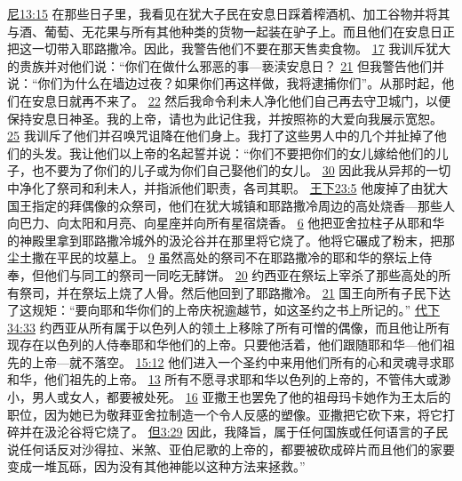 \documentclass[12pt, a4paper, oneside]{ctexart}
\begin{document}
{		\href{https://biblehub.com/nehemiah/13-15.htm}{尼13:15} 在那些日子里，我看见在犹大子民在安息日踩着榨酒机、加工谷物并将其与酒、葡萄、无花果与所有其他种类的货物一起装在驴子上。而且他们在安息日正把这一切带入耶路撒冷。因此，我警告他们不要在那天售卖食物。
		\href{https://biblehub.com/nehemiah/13-17.htm}{17} 我训斥犹大的贵族并对他们说：“你们在做什么邪恶的事---亵渎安息日？
		\href{https://biblehub.com/nehemiah/13-21.htm}{21} 但我警告他们并说：“你们为什么在墙边过夜？如果你们再这样做，我将逮捕你们”。从那时起，他们在安息日就再不来了。
		\href{https://biblehub.com/nehemiah/13-22.htm}{22} 然后我命令利未人净化他们自己再去守卫城门，以便保持安息日神圣。我的上帝，请也为此记住我，并按照祢的大爱向我展示宽恕。
		\href{https://biblehub.com/nehemiah/13-25.htm}{25} 我训斥了他们并召唤咒诅降在他们身上。我打了这些男人中的几个并扯掉了他们的头发。我让他们以上帝的名起誓并说：“你们不要把你们的女儿嫁给他们的儿子，也不要为了你们的儿子或为你们自己娶他们的女儿。
		\href{https://biblehub.com/nehemiah/13-30.htm}{30} 因此我从异邦的一切中净化了祭司和利未人，并指派他们职责，各司其职。
		\href{https://biblehub.com/2_kings/23-5.htm}{王下23:5} 他废掉了由犹大国王指定的拜偶像的众祭司，他们在犹大城镇和耶路撒冷周边的高处烧香---那些人向巴力、向太阳和月亮、向星座并向所有星宿烧香。
		\href{https://biblehub.com/2_kings/23-6.htm}{6} 他把亚舍拉柱子从耶和华的神殿里拿到耶路撒冷城外的汲沦谷并在那里将它烧了。他将它碾成了粉末，把那尘土撒在平民的坟墓上。
		\href{https://biblehub.com/2_kings/23-9.htm}{9} 虽然高处的祭司不在耶路撒冷的耶和华的祭坛上侍奉，但他们与同工的祭司一同吃无酵饼。
		\href{https://biblehub.com/2_kings/23-20.htm}{20} 约西亚在祭坛上宰杀了那些高处的所有祭司，并在祭坛上烧了人骨。然后他回到了耶路撒冷。
		\href{https://biblehub.com/2_kings/23-21.htm}{21} 国王向所有子民下达了这规矩：“要向耶和华你们的上帝庆祝逾越节，如这圣约之书上所记的。”
		\href{https://biblehub.com/2_chronicles/34-33.htm}{代下34:33} 约西亚从所有属于以色列人的领土上移除了所有可憎的偶像，而且他让所有现存在以色列的人侍奉耶和华他们的上帝。只要他活着，他们跟随耶和华---他们祖先的上帝---就不落空。
		\href{https://biblehub.com/2_chronicles/15-12.htm}{15:12} 他们进入一个圣约中来用他们所有的心和灵魂寻求耶和华，他们祖先的上帝。
		\href{https://biblehub.com/2_chronicles/15-13.htm}{13} 所有不愿寻求耶和华以色列的上帝的，不管伟大或渺小，男人或女人，都要被处死。
		\href{https://biblehub.com/2_chronicles/15-16.htm}{16} 亚撒王也罢免了他的祖母玛卡她作为王太后的职位，因为她已为敬拜亚舍拉制造一个令人反感的塑像。亚撒把它砍下来，将它打碎并在汲沦谷将它烧了。
		\href{https://biblehub.com/daniel/3-29.htm}{但3:29} 因此，我降旨，属于任何国族或任何语言的子民说任何话反对沙得拉、米煞、亚伯尼歌的上帝的，都要被砍成碎片而且他们的家要变成一堆瓦砾，因为没有其他神能以这种方法来拯救。”
}
\end{document}
